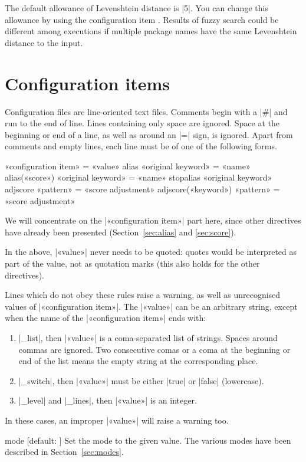 \documentclass[draft]{texdoc-doc}
\begin{document}
The default allowance of Levenshtein distance is |5|. You can change this
allowance by using the configuration item . Results of fuzzy
search could be different among executions if multiple package names have the
same Levenshtein distance to the input.

\section{Configuration items}
\label{sec:conf}

Configuration files are line-oriented text files. Comments begin with a |#|
and run to the end of line. Lines containing only space are ignored. Space at
the beginning or end of a line, as well as around an |=| sign, is ignored.
Apart from comments and empty lines, each line must be of one of the following
forms.
%
\begin{htcode}
«configuration item» = «value»
alias «original keyword» = «name»
alias(«score») «original keyword» = «name»
stopalias «original keyword»
adjscore «pattern» = «score adjustment»
adjscore(«keyword») «pattern» = «score adjustment»
\end{htcode}

We will concentrate on the |«configuration item»| part here, since other
directives have already been presented (Section~\ref{sec:alias} and
\ref{sec:score}).

In the above, |«value»|  never needs to be quoted: quotes would be interpreted
as part of the value, not as quotation marks (this also holds for the other
directives).

Lines which do not obey these rules raise a warning, as well as unrecognised
values of |«configuration item»|. The |«value»| can be an arbitrary string,
except when the name of the |«configuration item»| ends with:
%
\begin{enumerate}
\item |_list|, then |«value»| is a coma-separated list of strings. Spaces
  around commas are ignored. Two consecutive comas or a coma at the beginning
  or end of the list means the empty string at the corresponding place.
\item |_switch|, then |«value»| must be either |true| or |false|
  (lowercase).
\item |_level| and |_lines|, then |«value»| is an integer.
\end{enumerate}
%
In these cases, an improper |«value»| will raise a warning too.

\begin{confitem}{mode}
  {}[default: ]
Set the  mode to the given value. The various modes have been described
in Section~\ref{sec:modes}.
\end{confitem}
\end{document}
